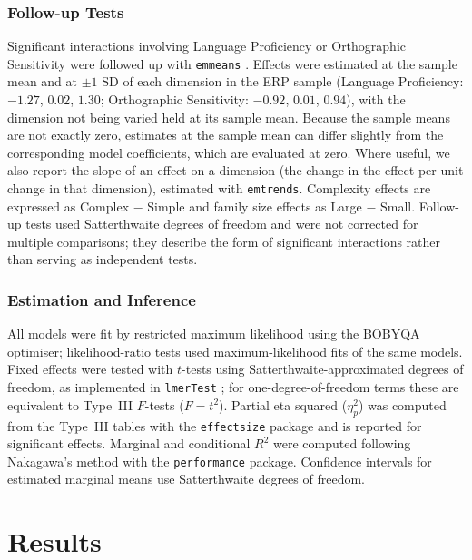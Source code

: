 \documentclass[utf8]{FrontiersinHarvard} %
\begin{document}
\subsubsection{Follow-up Tests}

Significant interactions involving Language Proficiency or Orthographic Sensitivity were followed up with \texttt{emmeans} \citep{lenthEmmeansEstimatedMarginal2026}. Effects were estimated at the sample mean and at $\pm 1$ SD of each dimension in the ERP sample (Language Proficiency: $-1.27$, $0.02$, $1.30$; Orthographic Sensitivity: $-0.92$, $0.01$, $0.94$), with the dimension not being varied held at its sample mean. Because the sample means are not exactly zero, estimates at the sample mean can differ slightly from the corresponding model coefficients, which are evaluated at zero. Where useful, we also report the slope of an effect on a dimension (the change in the effect per unit change in that dimension), estimated with \texttt{emtrends}. Complexity effects are expressed as Complex $-$ Simple and family size effects as Large $-$ Small. Follow-up tests used Satterthwaite degrees of freedom and were not corrected for multiple comparisons; they describe the form of significant interactions rather than serving as independent tests.

\subsubsection{Estimation and Inference}

All models were fit by restricted maximum likelihood using the BOBYQA optimiser; likelihood-ratio tests used maximum-likelihood fits of the same models. Fixed effects were tested with $t$-tests using Satterthwaite-approximated degrees of freedom, as implemented in \texttt{lmerTest} \citep{kuznetsovaLmerTestPackageTests2017}; for one-degree-of-freedom terms these are equivalent to Type~III $F$-tests ($F = t^2$). Partial eta squared ($\eta^2_p$) was computed from the Type~III tables with the \texttt{effectsize} package and is reported for significant effects. Marginal and conditional $R^2$ were computed following Nakagawa's method with the \texttt{performance} package. Confidence intervals for estimated marginal means use Satterthwaite degrees of freedom.


\section{Results}
\end{document}

